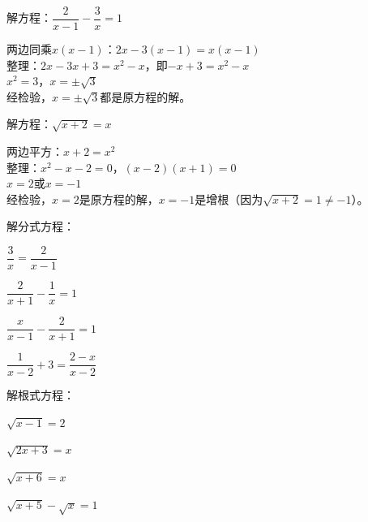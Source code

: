 \documentclass[a4paper,12pt]{ctexart}
\begin{document}
\newpage




\begin{example}
解方程：$\dfrac{2}{x-1}-\dfrac{3}{x}=1$
\end{example}
\begin{solution}
两边同乘$x(x-1)$：$2x-3(x-1)=x(x-1)$\\
整理：$2x-3x+3=x^2-x$，即$-x+3=x^2-x$\\
$x^2=3$，$x=\pm\sqrt3$\\
经检验，$x=\pm\sqrt3$都是原方程的解。
\end{solution}



\begin{example}
解方程：$\sqrt{x+2}=x$
\end{example}
\begin{solution}
两边平方：$x+2=x^2$\\
整理：$x^2-x-2=0$，$(x-2)(x+1)=0$\\
$x=2$或$x=-1$\\
经检验，$x=2$是原方程的解，$x=-1$是增根（因为$\sqrt{x+2}=1\neq-1$）。
\end{solution}


\begin{exercise}
\item 解分式方程：
  \begin{subexercise}
    \item $\dfrac{3}{x}=\dfrac{2}{x-1}$
    \item $\dfrac{2}{x+1}-\dfrac{1}{x}=1$
    \item $\dfrac{x}{x-1}-\dfrac{2}{x+1}=1$
    \item $\dfrac{1}{x-2}+3=\dfrac{2-x}{x-2}$
  \end{subexercise}

\item 解根式方程：
  \begin{subexercise}
    \item $\sqrt{x-1}=2$
    \item $\sqrt{2x+3}=x$
    \item $\sqrt{x+6}=x$
    \item $\sqrt{x+5}-\sqrt{x}=1$
  \end{subexercise}
\end{exercise}
\end{document}
